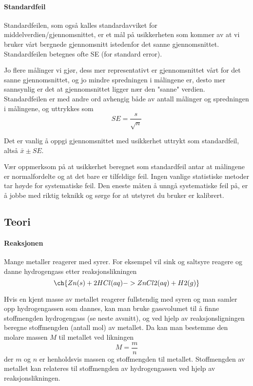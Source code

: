 	\paragraph{Standardfeil}
	Standardfeilen, som også kalles standardavviket for middelverdien/gjennomsnittet, er et mål på usikkerheten som kommer av at vi bruker vårt bergnede gjennomsnitt istedenfor det sanne gjennomsnittet. Standardfeilen betegnes ofte SE (for standard error).
	
	Jo flere målinger vi gjør, dess mer representativt er gjennomsnittet vårt for det sanne gjennomsnittet, og jo mindre spredningen i målingene er, desto mer sannsynlig er det at gjennomsnittet ligger nær den "sanne" verdien. Standardfeilen er med andre ord avhengig både av antall målinger og spredningen i målingene, og uttrykkes som 
	\begin{equation}
		SE =\frac{s}{\sqrt{n}}
	\end{equation}
	
	Det er vanlig å oppgi gjennomsnittet med usikkerhet uttrykt som standardfeil, altså $\bar{x}\pm SE$.
	
	
	Vær oppmerksom på at usikkerhet beregnet som standardfeil antar at målingene er normalfordelte og at det bare er tilfeldige feil. Ingen vanlige statistiske metoder tar høyde for systematiske feil. Den eneste måten å unngå systematiske feil på, er å jobbe med riktig teknikk og sørge for at utstyret du bruker er kalibrert.
	
	
	\subsection{Teori}
	\paragraph{Reaksjonen}
	Mange metaller reagerer med syrer. For eksempel vil sink og saltsyre reagere og danne hydrogengass etter reaksjonslikningen
	\begin{equation*}
		\ch{Zn (s) + 2 HCl (aq) -> ZnCl2 (aq) + H2 (g)}    
	\end{equation*}
	
	Hvis en kjent masse av metallet reagerer fullstendig med syren og man samler opp hydrogengassen som dannes, kan man bruke gassvolumet til å finne stoffmengden hydrogengass (se neste avsnitt), og ved hjelp av reaksjonsligningen beregne stoffmengden (antall mol) av metallet. Da kan man bestemme den molare massen $M$ til metallet ved likningen
	\begin{equation}
	M = \frac{m}{n}
	\end{equation}
	der $m$ og $n$ er henholdsvis massen og stoffmengden til metallet. Stoffmengden av metallet kan relateres til stoffmengden av hydrogengassen ved hjelp av reaksjonslikningen. 
	
